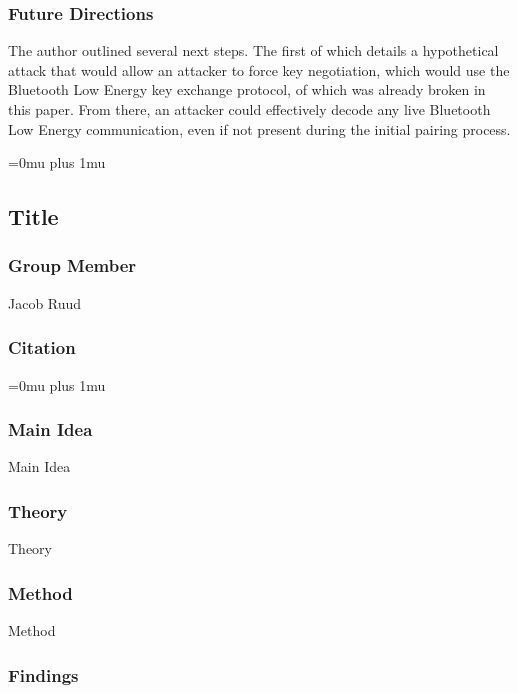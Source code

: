 \subsubsection{Future Directions}

\noindent
The author outlined several next steps.  The first of which details a hypothetical attack that would allow an attacker to force key negotiation, which would use the Bluetooth Low Energy key exchange protocol, of which was already broken in this paper.  From there, an attacker could effectively decode any live Bluetooth Low Energy communication, even if not present during the initial pairing process.

\Urlmuskip=0mu plus 1mu\relax

\noindent
\subsection{Title}

\subsubsection{Group Member}

\noindent
Jacob Ruud
\noindent
\subsubsection{Citation}

\Urlmuskip=0mu plus 1mu\relax

\subsubsection{Main Idea}

\noindent
Main Idea

\subsubsection{Theory}

\noindent
Theory

\subsubsection{Method}

\noindent
Method

\subsubsection{Findings}

